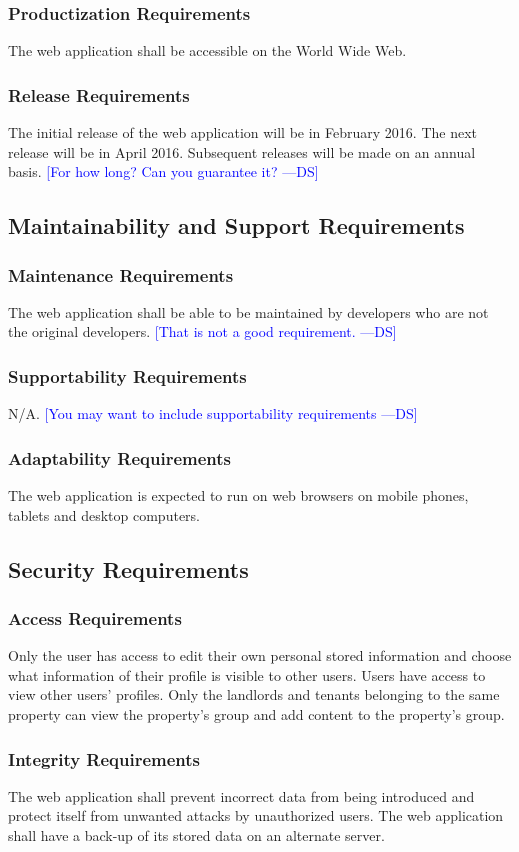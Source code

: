 \documentclass[12pt, titlepage]{article}
\newcommand{\authornote}[3]{\textcolor{#1}{[#3 ---#2]}}
\newcommand{\authornote}[3]{}
\newcommand{\ds}[1]{\authornote{blue}{DS}{#1}}
\begin{document}
{\subsubsection{Productization Requirements}
The web application shall be accessible on the World Wide Web.
\subsubsection{Release Requirements}
The initial release of the web application will be in February 2016. The next 
release will be in April 2016. Subsequent releases will be made on an annual 
basis. \ds{For how long? Can you guarantee it?}
\subsection{Maintainability and Support Requirements}
\subsubsection{Maintenance Requirements}
The web application shall be able to be maintained by developers who are not the 
original developers.
\ds{That is not a good requirement.}
\subsubsection{Supportability Requirements}
N/A. 
\ds{You may want to include supportability requirements}

\subsubsection{Adaptability Requirements}
The web application is expected to run on web browsers on mobile phones, tablets 
and desktop computers.
\subsection{Security Requirements}
\subsubsection{Access Requirements}
Only the user has access to edit their own personal stored information and 
choose what information of their profile is visible to other users. Users have 
access to view other users' profiles. Only the landlords and tenants belonging 
to the same property can view the property's group and add content to the 
property's group.
\subsubsection{Integrity Requirements}
The web application shall prevent incorrect data from being introduced and 
protect itself from unwanted attacks by unauthorized users. The web application 
shall have a back-up of its stored data on an alternate server.
}
\end{document}
